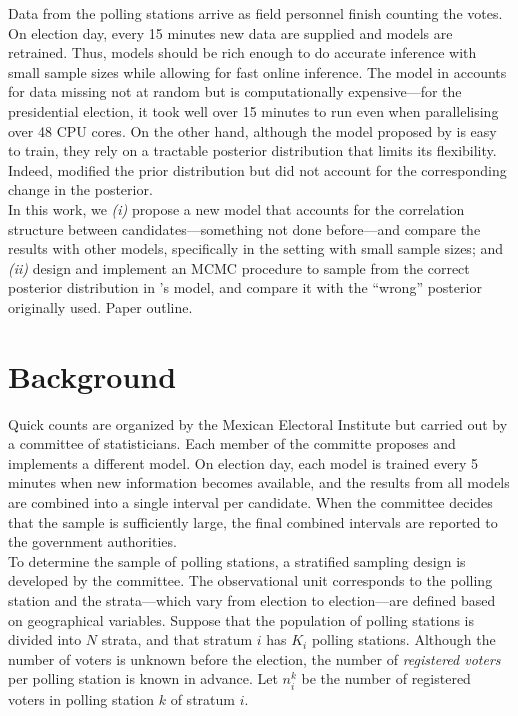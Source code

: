 \documentclass{article}
\begin{document}
Data from the polling stations arrive as field personnel finish counting the votes. On election day, every 15 minutes new data are supplied and models are retrained. Thus, models should be rich enough to do accurate inference with small sample sizes while allowing for fast online inference. The model in \citep{anzarut2018} accounts for data missing not at random but is computationally expensive---for the presidential election, it took well over 15 minutes to run even when parallelising over 48 CPU cores. On the other hand, although the model proposed by \citep{mendoza-nieto2016} is easy to train, they rely on a tractable posterior distribution that limits its flexibility. Indeed, \citet{diluvi2018} modified the prior distribution but did not account for the corresponding change in the posterior.
\\


In this work, we \textit{(i)} propose a new model that accounts for the correlation structure between candidates---something not done before---and compare the results with other models, specifically in the setting with small sample sizes; and \textit{(ii)} design and implement an MCMC procedure to sample from the correct posterior distribution in \citet{diluvi2018}'s model, and compare it with the ``wrong'' posterior originally used. Paper outline.


\section{Background}


Quick counts are organized by the Mexican Electoral Institute but carried out by a committee of statisticians. Each member of the committe proposes and implements a different model. On election day, each model is trained every 5 minutes when new information becomes available, and the results from all models are combined into a single interval per candidate. When the committee decides that the sample is sufficiently large, the final combined intervals are reported to the government authorities. \\

To determine the sample of polling stations, a stratified sampling design is developed by the committee. The observational unit corresponds to the polling station and the strata---which vary from election to election---are defined based on geographical variables. Suppose that the population of polling stations is divided into $N$ strata, and that stratum $i$ has $K_i$ polling stations. Although the number of voters is unknown before the election, the number of \textit{registered voters} per polling station is known in advance. Let $n_i^k$ be the number of registered voters in polling station $k$ of stratum $i$. \\
\end{document}

